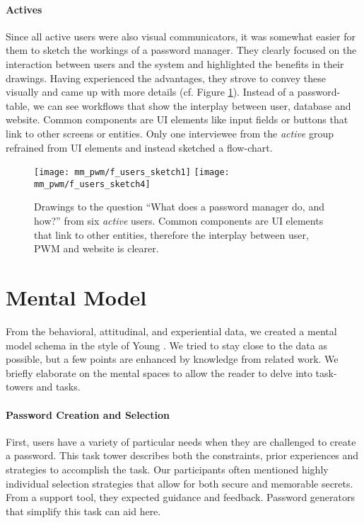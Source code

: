 \paragraph{Actives} Since all active users were also visual communicators, it was somewhat easier for them to sketch the workings of a password manager. They clearly focused on the interaction between users and the system and highlighted the benefits in their drawings. Having experienced the advantages, they strove to convey these visually and came up with more details (cf. Figure \ref{fig:mm_pwm:f_actives_sketch1}). Instead of a password-table, we can see workflows that show the interplay between user, database and website. Common components are UI elements like input fields
or buttons that link to other screens or entities. Only one interviewee from the \textit{active} group refrained from UI elements and instead sketched a flow-chart. 
\begin{figure}
	\centering
	\texttt{[image: mm\_pwm/f\_users\_sketch1]}
	\texttt{[image: mm\_pwm/f\_users\_sketch4]}
	\caption{\label{fig:mm_pwm:f_actives_sketch1} Drawings to the question ``What does a password manager do, and how?'' from six \textit{active} users. Common components are UI elements that link to other entities, therefore the interplay between user, PWM and website is clearer.}
\end{figure}

\section{Mental Model}\label{ref:mm_pwm:mm-description}
From the behavioral, attitudinal, and experiential data, we created a mental model schema in the style of Young \cite{Young2008}. We tried to stay close to the data as possible, but a few points are enhanced by knowledge from related work. We briefly elaborate on the mental spaces to allow the reader to delve into task-towers and tasks. 

\paragraph{Password Creation and Selection}
First, users have a variety of particular needs when they are challenged to create a password. This task tower describes both the constraints, prior experiences and strategies to accomplish the task. Our participants often mentioned highly individual selection strategies that allow for both secure and memorable secrets. From a support tool, they expected guidance and feedback. Password generators that simplify this task can aid here. 

